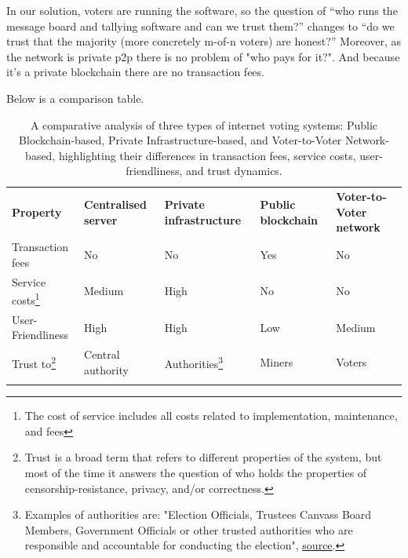 \documentclass{article}
\begin{document}
In our solution, voters are running the software, so the question of “who runs the message board and tallying software and can we trust them?” changes to “do we trust that the majority (more concretely m-of-n voters) are honest?” Moreover, as the network is private p2p there is no problem of "who pays for it?". And because it's a private blockchain there are no transaction fees.

Below is a comparison table.

\newcommand{\fullmoon}{\tikz\filldraw[fill=black] (0,0) circle (0.5em);}
\newcommand{\newmoon}{\tikz\draw (0,0) circle (0.5em);}
\newcommand{\rightmoon}{\tikz\draw (0,0) circle (0.5em); \filldraw[fill=black] (0,0) arc (90:270:0.5em) -- cycle;}
\newcommand{\leftmoon}{\tikz\draw (0,0) circle (0.5em); \filldraw[fill=black] (0,0) arc (270:90:0.5em) -- cycle;}
\newcommand{\halfmoon}{\tikz\draw (0,0) circle (0.5em); \filldraw[fill=black] (0,-0.5em) rectangle (0,0.5em);}


\begin{table}
\centering
\newcommand{\YES}{\cellcolor{red!50}Yes}
\newcommand{\NO}{\cellcolor{green!50}No}
\caption{A comparative analysis of three types of internet voting systems: Public Blockchain-based, Private Infrastructure-based, and Voter-to-Voter Network-based, highlighting their differences in transaction fees, service costs, user-friendliness, and trust dynamics.}
\begin{tabular}{p{}p{}p{}p{}p{}}
\noalign{\smallskip}\hline\noalign{\smallskip}
\textbf{Property} & \textbf{Centralised server} & \textbf{Private infrastructure} & \textbf{Public blockchain} & \textbf{Voter-to-Voter network} \\
\noalign{\smallskip}\hline\noalign{\smallskip}
Transaction fees & \NO & \NO & \YES & \NO \\
\hline
Service costs\footnote{The cost of service includes all costs related to implementation, maintenance, and fees} & \cellcolor{yellow!50} Medium & \cellcolor{red!50} High & \cellcolor{green!50} No  & \cellcolor{green!50} No \\
\hline
User-Friendliness & \cellcolor{green!50} High & \cellcolor{green!50}High & \cellcolor{red!50} Low & \cellcolor{yellow!50} Medium \\
\hline
Trust to\footnote{Trust is a broad term that refers to different properties of the system, but most of the time it answers the question of who holds the properties of censorship-resistance, privacy, and/or correctness.} & \cellcolor{red!50} Central authority & \cellcolor{yellow!50} Authorities\footnote{Examples of authorities are: "Election Officials, Trustees Canvass Board Members, Government Officials or other trusted authorities who are responsible and accountable for conducting the election", \href{http://www.electionguard.vote/basics/steps/1_Key_Ceremony/}{source}.} & \cellcolor{yellow!50} Miners & \cellcolor{yellow!50} Voters  \\
\noalign{\smallskip}\hline

\hline
\end{tabular}
\end{table}
\end{document}
